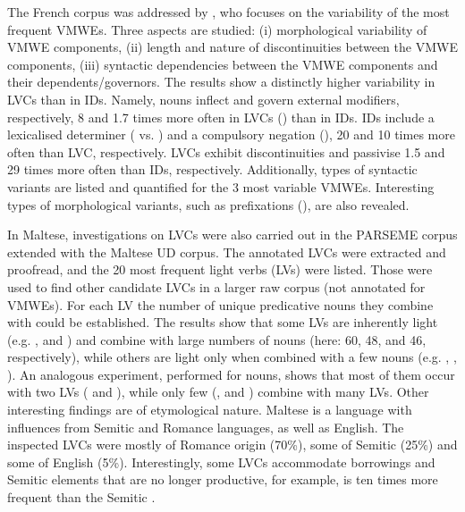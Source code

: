 \documentclass[output=paper,modfonts]{langscibook}
\begin{document}
The French corpus was addressed by \citet{Pasquer17}, who focuses on the variability of the most frequent VMWEs. Three aspects are studied: (i) morphological variability of VMWE components, (ii) length and nature of discontinuities between the VMWE components, (iii) syntactic dependencies between the VMWE components and their dependents/governors. The results show a distinctly higher variability in LVCs than in IDs. Namely, nouns inflect and govern external modifiers, respectively, 8 and 1.7 times more often in LVCs () than in IDs. IDs include a lexicalised determiner ( vs. ) and a compulsory negation (), 20 and 10 times more often than LVC, respectively.
LVCs exhibit discontinuities and passivise 1.5 and 29 times more often than IDs, respectively. 
Additionally, types of syntactic variants are listed and quantified for the 3 most variable VMWEs.  Interesting types of morphological variants, such as prefixations (), are also revealed.

In Maltese, investigations on LVCs were also carried out in the PARSEME corpus extended with the Maltese UD corpus. The annotated LVCs were extracted and proofread, and the 20 most frequent light verbs (LVs) were listed. Those were used to find other candidate LVCs in a  larger raw corpus (not annotated for VMWEs). For each LV the number of unique predicative nouns they combine with could be established. The results show that some LVs are inherently light (e.g. ,  and ) and combine with large numbers of nouns (here: 60, 48, and 46, respectively), while others are light only when combined with a few nouns (e.g. , , ). An analogous experiment, performed for nouns, shows that most of them occur with two LVs ( and ), while only few (,  and ) combine with many LVs. Other interesting findings are of etymological nature. Maltese is a language with influences from Semitic and Romance languages, as well as English. The inspected LVCs were mostly of Romance origin (70\%), some of Semitic (25\%) and some of English (5\%). Interestingly, some LVCs accommodate borrowings and Semitic elements that are no longer productive, for example,  is ten times more frequent than the Semitic . 
\end{document}
